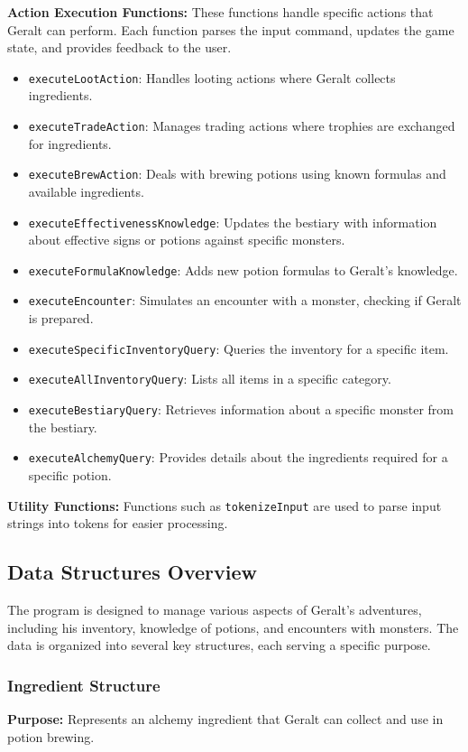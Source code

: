 \documentclass{article}
\begin{document}
\textbf{Action Execution Functions:} These functions handle specific actions that Geralt can perform. Each function parses the input command, updates the game state, and provides feedback to the user.

\begin{itemize}
    \item \texttt{executeLootAction}: Handles looting actions where Geralt collects ingredients.
    \item \texttt{executeTradeAction}: Manages trading actions where trophies are exchanged for ingredients.
    \item \texttt{executeBrewAction}: Deals with brewing potions using known formulas and available ingredients.
    \item \texttt{executeEffectivenessKnowledge}: Updates the bestiary with information about effective signs or potions against specific monsters.
    \item \texttt{executeFormulaKnowledge}: Adds new potion formulas to Geralt's knowledge.
    \item \texttt{executeEncounter}: Simulates an encounter with a monster, checking if Geralt is prepared.
    \item \texttt{executeSpecificInventoryQuery}: Queries the inventory for a specific item.
    \item \texttt{executeAllInventoryQuery}: Lists all items in a specific category.
    \item \texttt{executeBestiaryQuery}: Retrieves information about a specific monster from the bestiary.
    \item \texttt{executeAlchemyQuery}: Provides details about the ingredients required for a specific potion.
\end{itemize}

\textbf{Utility Functions:} Functions such as \texttt{tokenizeInput} are used to parse input strings into tokens for easier processing.

\subsection{Data Structures Overview}

The program is designed to manage various aspects of Geralt's adventures, including his inventory, knowledge of potions, and encounters with monsters. The data is organized into several key structures, each serving a specific purpose.

\subsubsection*{Ingredient Structure}
\textbf{Purpose:} Represents an alchemy ingredient that Geralt can collect and use in potion brewing.
\end{document}
